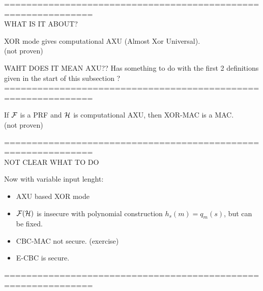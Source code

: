 ==============================================================\\
WHAT IS IT ABOUT?
\begin{lemma}
    XOR mode gives computational AXU (Almost Xor Universal).\\
    (not proven)
\end{lemma}
WAHT DOES IT MEAN AXU?? Has something to do with the first 2 definitions given
in the start of this subsection ?
==============================================================\\

\begin{theorem}
    If $\mathcal{F}$ is a PRF and $\mathcal{H}$ is computational AXU, then XOR-MAC is a MAC.\\
    (not proven)
\end{theorem}

==============================================================\\
NOT CLEAR WHAT TO DO 
\begin{exercise}
    Now with variable input lenght:
    \begin{itemize}
        \item AXU based XOR mode 
        \item $\mathcal{F}(\mathcal{H})$ is insecure with polynomial construction
            $h_{s}(m)=q_{m}(s)$, but can be fixed.
        \item CBC-MAC not secure. (exercise)
        \item E-CBC is secure.
    \end{itemize}
==============================================================\\
    
\end{exercise}
\newpage
